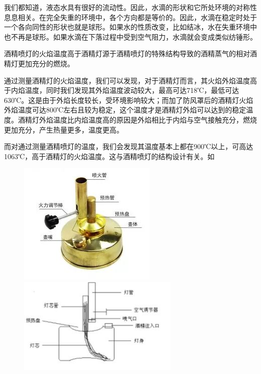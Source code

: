 \begin{multicols}{2}
\noindent{}

\noindent{} 我们都知道，液态水具有很好的流动性。因此，水滴的形状和它所处环境的对称性息息相关。在完全失重的环境中，各个方向都是等价的。因此，水滴在稳定时处于一个各向同性的形状也就是球形。如果水的性质改变，比如结冰，水在失重环境中也不再是球形。如果水滴在下落过程中受到空气阻力，水滴就会变成类似纺锤形。

\noindent{}

\noindent{} 酒精喷灯的火焰温度高于酒精灯源于酒精喷灯的特殊结构导致的酒精蒸气的相对酒精灯更加充分的燃烧。

通过测量酒精灯的火焰温度，我们可以发现，对于酒精灯而言，其火焰外焰温度高于内焰温度，同时我们发现其外焰温度波动较大，最高可达718℃，最低可达630℃。这是由于外焰长度较长，受环境影响较大；而加了防风罩后的酒精灯火焰外焰温度可达800℃左右且较为稳定，这个温度才是酒精灯外焰可以达到的稳定温度。酒精灯外焰温度比内焰温度高的原因是外焰相比于内焰与空气接触充分，燃烧更加充分，产生热量更多，温度更高。

而对通过测量酒精喷灯的温度，我们会发现其温度基本上都在900℃以上，可高达1063℃，高于酒精灯的火焰温度。这与酒精喷灯的结构设计有关。如

\begin{figure}[H]
\centering
\includegraphics[width=0.4\linewidth]{IMG/201909/190904}\includegraphics[width=0.6\linewidth]{IMG/201909/190905}
\end{figure}


\end{multicols}
